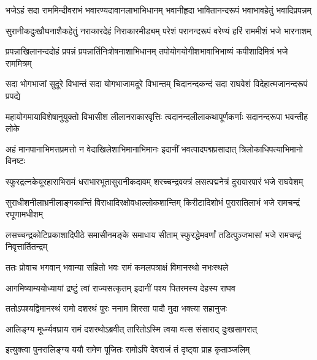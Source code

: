 \begin{minipage}{\linewidth}

\fourlineindentedshloka
{भजेऽहं सदा राममिन्दीवराभं}
{भवारण्यदावानलाभाभिधानम्}
{भवानीहृदा भावितानन्दरूपं}
{भवाभावहेतुं भवादिप्रपन्नम्} %
\end{minipage}

\fourlineindentedshloka
{सुरानीकदुःखौघनाशैकहेतुं}
{नराकारदेहं निराकारमीड्यम्}
{परेशं परानन्दरूपं वरेण्यं}
{हरिं राममीशं भजे भारनाशम्} %

\fourlineindentedshloka
{प्रपन्नाखिलानन्ददोहं प्रपन्नं}
{प्रपन्नार्तिनिःशेषनाशाभिधानम्}
{तपोयोगयोगीशभावाभिभाव्यं}
{कपीशादिमित्रं भजे राममित्रम्} %

\fourlineindentedshloka
{सदा भोगभाजां सुदूरे विभान्तं}
{सदा योगभाजामदूरे विभान्तम्}
{चिदानन्दकन्दं सदा राघवेशं}
{विदेहात्मजानन्दरूपं प्रपद्ये} %

\fourlineindentedshloka
{महायोगमायाविशेषानुयुक्तो}
{विभासीश लीलानराकारवृत्तिः}
{त्वदानन्दलीलाकथापूर्णकर्णाः}
{सदानन्दरूपा भवन्तीह लोके} %

\fourlineindentedshloka
{अहं मानपानाभिमत्तप्रमत्तो}
{न वेदाखिलेशाभिमानाभिमानः}
{इदानीं भवत्पादपद्मप्रसादात्}
{त्रिलोकाधिपत्याभिमानो विनष्टः} %

\fourlineindentedshloka
{स्फुरद्रत्नकेयूरहाराभिरामं}
{धराभारभूतासुरानीकदावम्}
{शरच्चन्द्रवक्त्रं लसत्पद्मनेत्रं}
{दुरावारपारं भजे राघवेशम्} %

\fourlineindentedshloka
{सुराधीशनीलाभ्रनीलाङ्गकान्तिं}
{विराधादिरक्षोवधाल्लोकशान्तिम्}
{किरीटादिशोभं पुरारातिलाभं}
{भजे रामचन्द्रं रघूणामधीशम्} %

\fourlineindentedshloka
{लसच्चन्द्रकोटिप्रकाशादिपीठे}
{समासीनमङ्के समाधाय सीताम्}
{स्फुरद्धेमवर्णां तडित्पुञ्जभासां}
{भजे रामचन्द्रं निवृत्तार्तितन्द्रम्} %

\twolineshloka
{ततः प्रोवाच भगवान् भवान्या सहितो भवः}
{रामं कमलपत्राक्षं विमानस्थो नभःस्थले} %

\twolineshloka
{आगमिष्याम्ययोध्यायां द्रष्टुं त्वां राज्यसत्कृतम्}
{इदानीं पश्य पितरमस्य देहस्य राघव} %

\twolineshloka
{ततोऽपश्यद्विमानस्थं रामो दशरथं पुरः}
{ननाम शिरसा पादौ मुदा भक्त्या सहानुजः} %

\twolineshloka
{आलिङ्ग्य मूर्ध्न्यवघ्राय रामं दशरथोऽब्रवीत्}
{तारितोऽस्मि त्वया वत्स संसाराद् दुःखसागरात्} %

\twolineshloka
{इत्युक्त्वा पुनरालिङ्ग्य ययौ रामेण पूजितः}
{रामोऽपि देवराजं तं दृष्ट्वा प्राह कृताञ्जलिम्} %

